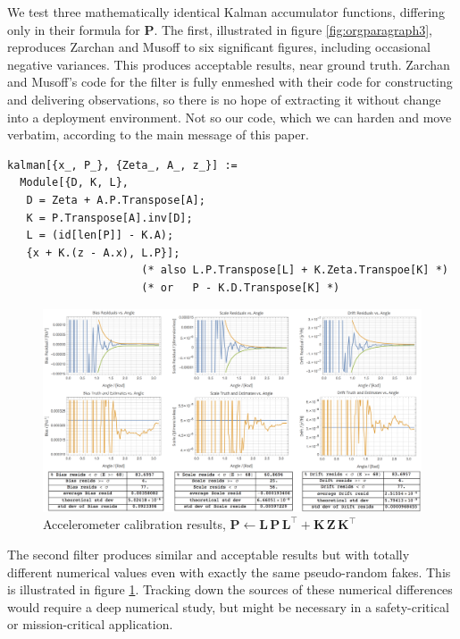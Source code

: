 \documentclass[10pt,oneside,x11names]{article}
\begin{document}
We test three mathematically identical Kalman accumulator functions, 
differing only in their formula for \(\mathbold{P}\). The first, illustrated in
figure \ref{fig:orgparagraph3}, reproduces Zarchan and Musoff to six significant
figures, including occasional negative variances. This produces acceptable
results, near ground truth. Zarchan and Musoff's code for the filter is
fully enmeshed with their code for constructing and delivering 
observations, so there is no hope of extracting it without change into a
deployment environment. Not so our code, which we can harden and move verbatim,
according to the main message of this paper.

\begin{verbatim}
kalman[{x_, P_}, {Zeta_, A_, z_}] :=
  Module[{D, K, L},
   D = Zeta + A.P.Transpose[A];
   K = P.Transpose[A].inv[D];
   L = (id[len[P]] - K.A);
   {x + K.(z - A.x), L.P}]; 
                     (* also L.P.Transpose[L] + K.Zeta.Transpoe[K] *)
                     (* or   P - K.D.Transpose[K] *)
\end{verbatim}

\begin{figure}[htb]
\centering
\includegraphics[width=.9\linewidth]{zarchan_musoff_2.png}
\caption{\label{fig:orgparagraph4}
Accelerometer calibration results, \(\mathbold{P} \leftarrow\mathbold{L}\,\mathbold{P}\,\mathbold{L}^\intercal +\mathbold{K}\,\mathbold{Z}\,\mathbold{K}^\intercal\)}
\end{figure}

The second filter produces similar and acceptable results but with totally
different numerical values even with exactly the same pseudo-random fakes. This
is illustrated in figure \ref{fig:orgparagraph4}. Tracking down the sources of
these numerical differences would require a deep numerical study, but might
be necessary in a safety-critical or mission-critical application.
\end{document}
